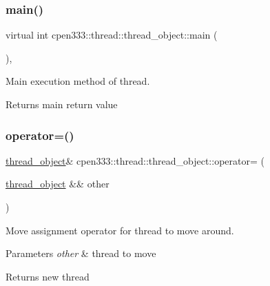 \subsubsection{\texorpdfstring{main()}{main()}}
{\footnotesize\ttfamily virtual int cpen333\+::thread\+::thread\+\_\+object\+::main (\begin{DoxyParamCaption}{ }\end{DoxyParamCaption})\hspace{0.3cm}{\ttfamily [protected]}, {}}



Main execution method of thread. 

\begin{DoxyReturn}{Returns}
main return value 
\end{DoxyReturn}
\mbox{\label{classcpen333_1_1thread_1_1thread__object_acae4bff517bb0a97e5f52820d99d3a5d}} 
\subsubsection{\texorpdfstring{operator=()}{operator=()}}
{\footnotesize\ttfamily \hyperlink{classcpen333_1_1thread_1_1thread__object}{thread\+\_\+object}\& cpen333\+::thread\+::thread\+\_\+object\+::operator= (\begin{DoxyParamCaption}\item[{\hyperlink{classcpen333_1_1thread_1_1thread__object}{thread\+\_\+object} \&\&}]{other }\end{DoxyParamCaption})\hspace{0.3cm}{\ttfamily [inline]}}



Move assignment operator for thread to move around. 


\begin{DoxyParams}{Parameters}
{\em other} & thread to move \\
\hline
\end{DoxyParams}
\begin{DoxyReturn}{Returns}
new thread 
\end{DoxyReturn}
\mbox{\label{classcpen333_1_1thread_1_1thread__object_ae4484909a3f4418c0c0db318d615bde1}} 
